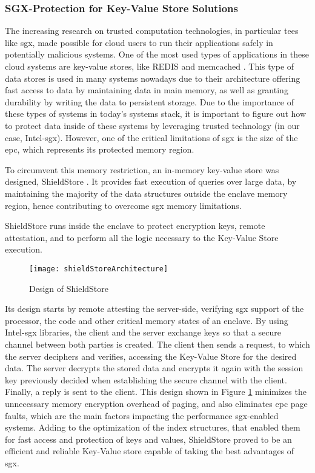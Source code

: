 \subsubsection{SGX-Protection for Key-Value Store Solutions}


The increasing research on trusted computation technologies, in particular \gls{tee}s like \gls{sgx}, made possible for cloud users to run their applications safely in potentially malicious systems. One of the most used types of applications in these cloud systems are key-value stores, like REDIS \cite{redisWebsite} and memcached \cite{memcachedWebsite}. This type of data stores is used in many systems nowadays due to their architecture offering fast access to data by maintaining data in main memory, as well as granting durability by writing the data to persistent storage.  Due to the importance of these types of systems in today's systems stack, it is important to figure out how to protect data inside of these systems by leveraging trusted technology (in our case, Intel-\gls{sgx}). However, one of the critical limitations of \gls{sgx} is the size of the \gls{epc}, which represents its protected memory region. 

To circumvent this memory restriction, an in-memory key-value store was designed, ShieldStore \cite{shieldStorePaper}. It provides fast execution of queries over large data, by maintaining the majority of the data structures outside the enclave memory region, hence contributing to overcome \gls{sgx} memory limitations.

ShieldStore runs inside the enclave to protect encryption keys, remote attestation, and to perform all the logic necessary to the Key-Value Store execution.
\begin{figure}[htbp]
	\centering
	{\texttt{[image: shieldStoreArchitecture]}}
	\caption{Design of ShieldStore}
	\label{fig:shieldStoreArchitecture}
\end{figure}

Its design starts by remote attesting the server-side, verifying \gls{sgx} support of the processor, the code and other critical memory states of an enclave. By using Intel-\gls{sgx} libraries, the client and the server exchange keys so that a secure channel between both parties is created. The client then sends a request, to which the server deciphers and verifies, accessing the Key-Value Store for the desired data. The server decrypts the stored data and encrypts it again with the session key previously decided when establishing the secure channel with the client. Finally, a reply is sent to the client.    
This design shown in Figure \ref{fig:shieldStoreArchitecture} minimizes the unnecessary memory encryption overhead of paging, and also eliminates \gls{epc} page faults, which are the main factors impacting the performance \gls{sgx}-enabled systems. Adding to the optimization of the index structures, that enabled them for fast access and protection of keys and values, ShieldStore proved to be an efficient and reliable Key-Value store capable of taking the best advantages of \gls{sgx}.\newline

